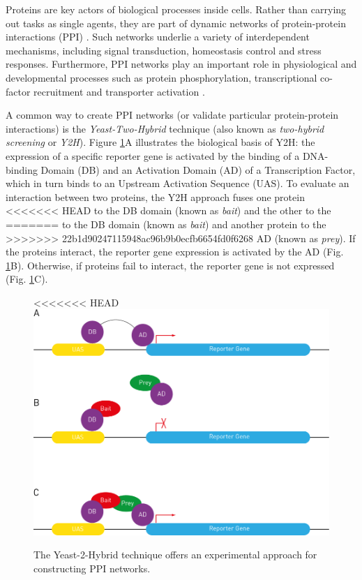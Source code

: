 Proteins are key actors of biological processes inside cells. Rather
than carrying out tasks as single agents, they are part of dynamic
networks of protein-protein interactions (PPI) \cite{Lin2017}. Such
networks underlie a variety of interdependent mechanisms, including
signal transduction, homeostasis control and stress responses. Furthermore,
PPI networks play an important role in physiological and developmental
processes such as protein phosphorylation, transcriptional co-factor
recruitment and transporter activation \cite{Zhang2010PPI}.

A common way to create PPI networks (or validate particular protein-protein
interactions) is the \emph{Yeast-Two-Hybrid} technique (also known
as \emph{two-hybrid screening} or \emph{Y2H}). Figure \ref{Y2H}A
illustrates the biological basis of Y2H: the expression of a specific
reporter gene is activated by the binding of a DNA-binding Domain
(DB) and an Activation Domain (AD) of a Transcription Factor, which
in turn binds to an Upstream Activation Sequence (UAS). To evaluate
an interaction between two proteins, the Y2H approach fuses one protein
<<<<<<< HEAD
to the DB domain (known as \emph{bait}) and the other to the
=======
to the DB domain (known as \emph{bait}) and another protein to the
>>>>>>> 22b1d90247115948ac96b9b0ecfb6654fd0f6268
AD (known as \emph{prey}). If the proteins interact, the reporter
gene expression is activated by the AD (Fig. \ref{Y2H}B). Otherwise,
if proteins fail to interact, the reporter gene is not expressed (Fig.
\ref{Y2H}C).

\begin{figure}[h]
\caption{\label{Y2H}The Yeast-2-Hybrid technique offers an experimental approach
for constructing PPI networks.}
<<<<<<< HEAD
\centering
	\includegraphics[width=0.7\columnwidth]{../Y2H}
\end{figure}

